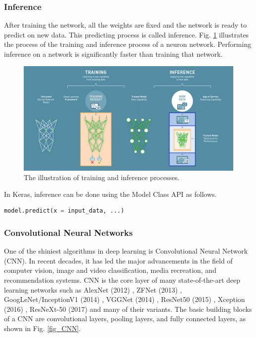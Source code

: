 \subsubsection{Inference}
After training the network, all the weights are fixed and the network is ready to predict on new data. This predicting process is called inference. Fig. \ref{fig_train_vs_infer} illustrates the process of the training and inference process of a neuron network. Performing inference on a network is significantly faster than training that network.
\begin{figure}[h!]
\begin{center}
\includegraphics[width = 13cm]{img/train_inference.jpg}
\caption{The illustration of training and inference processes. \label{fig_train_vs_infer}}
\end{center}
\end{figure}

In Keras, inference can be done using the Model Class API as follows.
\begin{lstlisting}[language=python,frame=single]
model.predict(x = input_data, ...)
\end{lstlisting}

\subsubsection{Convolutional Neural Networks}
One of the shiniest algorithms in deep learning is Convolutional Neural Network (CNN). In recent decades, it has led the major advancements in the field of computer vision, image and video classification, media recreation, and recommendation systems. CNN is the core layer of many state-of-the-art deep learning networks such as AlexNet (2012) \cite{krizhevsky2012imagenet}, ZFNet (2013) \cite{zeiler2014visualizing}, GoogLeNet/InceptionV1 (2014) \cite{szegedy2015going}, VGGNet (2014) \cite{simonyan2014very}, ResNet50 (2015) \cite{he2016deep}, Xception (2016) \cite{chollet2017xception}, ResNeXt-50 (2017) \cite{xie2017aggregated} and many of their variants. The basic building blocks of a CNN are convolutional layers, pooling layers, and fully connected layers, as shown in Fig. \ref{fig_CNN}. 

